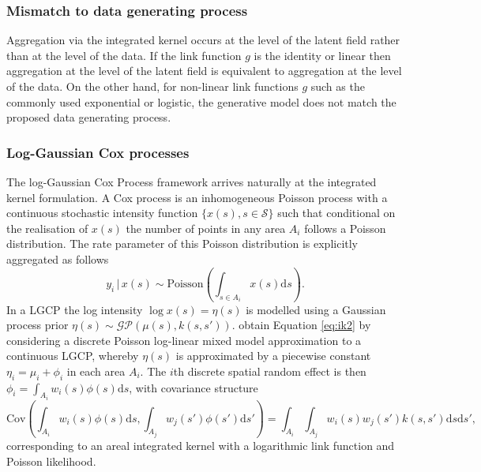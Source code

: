 \documentclass[a4paper, nobind]{templates/ociamthesis}
\begin{document}
\hypertarget{mismatch-to-data-generating-process}{%
\subsubsection{Mismatch to data generating process}\label{mismatch-to-data-generating-process}}

Aggregation via the integrated kernel occurs at the level of the latent field rather than at the level of the data.
If the link function \(g\) is the identity or linear then aggregation at the level of the latent field is equivalent to aggregation at the level of the data.
On the other hand, for non-linear link functions \(g\) such as the commonly used exponential or logistic, the generative model does not match the proposed data generating process.

\hypertarget{log-gaussian-cox-processes}{%
\subsubsection{Log-Gaussian Cox processes}\label{log-gaussian-cox-processes}}

The log-Gaussian Cox Process framework \autocite{diggle2013spatial} arrives naturally at the integrated kernel formulation.
A Cox process is an inhomogeneous Poisson process with a continuous stochastic intensity function \(\{ x(s), s \in \mathcal{S} \}\) such that conditional on the realisation of \(x(s)\) the number of points in any area \(A_i\) follows a Poisson distribution.
The rate parameter of this Poisson distribution is explicitly aggregated as follows
\begin{equation}
  y_i \, | \, x(s) \sim \text{Poisson} \left(\int_{s \in A_i} x(s) \text{d}s \right).
\end{equation}
In a LGCP the log intensity \(\log x(s) = \eta(s)\) is modelled using a Gaussian process prior \(\eta(s) \sim \mathcal{GP}(\mu(s), k(s, s'))\).
\textcite{johnson2019spatially} obtain Equation \eqref{eq:ik2} by considering a discrete Poisson log-linear mixed model approximation to a continuous LGCP, whereby \(\eta(s)\) is approximated by a piecewise constant \(\eta_i = \mu_i + \phi_i\) in each area \(A_i\).
The \(i\)th discrete spatial random effect is then \(\phi_i = \int_{A_i} w_i(s) \phi(s) \text{d}s\),
with covariance structure
\begin{equation}
  \text{Cov} \left( \int_{A_i} w_i(s) \phi(s) \text{d}s, \int_{A_j} w_j(s') \phi(s') \text{d}s' \right)
  = \int_{A_i} \int_{A_j} w_i(s) w_j(s') k(s, s') \text{d}s\text{d}s',
\end{equation}
corresponding to an areal integrated kernel with a logarithmic link function and Poisson likelihood.
\end{document}
